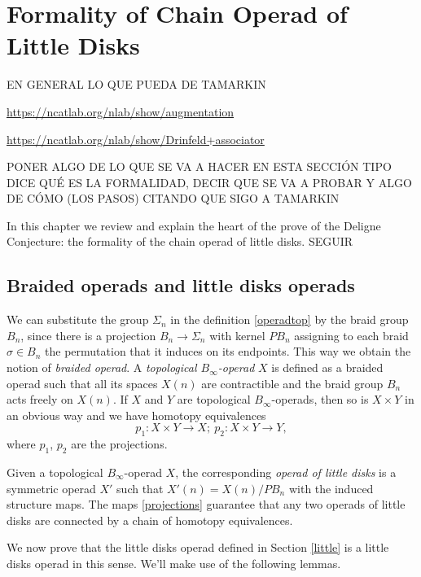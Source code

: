 \documentclass[TFM.tex]{subfiles}
\begin{document}
\chapter{Formality of Chain Operad of Little Disks}



EN GENERAL LO QUE PUEDA DE TAMARKIN


\url{https://ncatlab.org/nlab/show/augmentation}

\url{https://ncatlab.org/nlab/show/Drinfeld+associator}


PONER ALGO DE LO QUE SE VA A HACER EN ESTA SECCIÓN TIPO DICE QUÉ ES LA FORMALIDAD, DECIR QUE SE VA A PROBAR Y ALGO DE CÓMO (LOS PASOS) CITANDO QUE SIGO A TAMARKIN

In this chapter we review and explain the heart of the prove of the Deligne Conjecture: the formality of the chain operad of little disks. SEGUIR

\section{Braided operads and little disks operads}

We can substitute the group $\Sigma_n$ in the definition \ref{operadtop} by the braid group $B_n$, since there is a projection $B_n\to \Sigma_n$ with kernel $PB_n$ assigning to each braid $\sigma\in B_n$ the permutation that it induces on its endpoints. This way we obtain the notion of \emph{braided operad}. A \emph{topological $B_\infty$-operad} $X$ is defined as a braided operad such that all its spaces $X(n)$ are contractible and the braid group $B_n$ acts freely on $X(n)$. If $X$ and $Y$ are topological $B_\infty$-operads, then so is $X\times Y$ in an obvious way and we have homotopy equivalences 
\begin{equation}\label{projections}
p_1:X\times Y\to X;\ p_2:X\times Y\to Y,
\end{equation}
where $p_1$, $p_2$ are the projections. 

Given a topological $B_\infty$-operad $X$, the corresponding \emph{operad of little disks} is a symmetric operad $X'$ such that $X'(n)=X(n)/PB_n$ with the induced structure maps. The maps \ref{projections} guarantee that any two operads of little disks are connected by a chain of homotopy equivalences.


We now prove that the little disks operad defined in Section \ref{little} is a little disks operad in this sense. We'll make use of the following lemmas.
\end{document}
